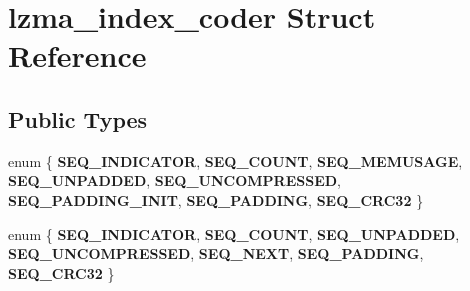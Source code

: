 \section{lzma\+\_\+index\+\_\+coder Struct Reference}
\label{structlzma__index__coder}
\subsection*{Public Types}
\begin{DoxyCompactItemize}
\item 
\mbox{\label{structlzma__index__coder_a0abb38e624bd25f4d8f9a8c272f33d70}} 
enum \{ \newline
{\bfseries S\+E\+Q\+\_\+\+I\+N\+D\+I\+C\+A\+T\+OR}, 
{\bfseries S\+E\+Q\+\_\+\+C\+O\+U\+NT}, 
{\bfseries S\+E\+Q\+\_\+\+M\+E\+M\+U\+S\+A\+GE}, 
{\bfseries S\+E\+Q\+\_\+\+U\+N\+P\+A\+D\+D\+ED}, 
\newline
{\bfseries S\+E\+Q\+\_\+\+U\+N\+C\+O\+M\+P\+R\+E\+S\+S\+ED}, 
{\bfseries S\+E\+Q\+\_\+\+P\+A\+D\+D\+I\+N\+G\+\_\+\+I\+N\+IT}, 
{\bfseries S\+E\+Q\+\_\+\+P\+A\+D\+D\+I\+NG}, 
{\bfseries S\+E\+Q\+\_\+\+C\+R\+C32}
 \}
\item 
\mbox{\label{structlzma__index__coder_a86725ed3a3240be4643ebb20cece6c31}} 
enum \{ \newline
{\bfseries S\+E\+Q\+\_\+\+I\+N\+D\+I\+C\+A\+T\+OR}, 
{\bfseries S\+E\+Q\+\_\+\+C\+O\+U\+NT}, 
{\bfseries S\+E\+Q\+\_\+\+U\+N\+P\+A\+D\+D\+ED}, 
{\bfseries S\+E\+Q\+\_\+\+U\+N\+C\+O\+M\+P\+R\+E\+S\+S\+ED}, 
\newline
{\bfseries S\+E\+Q\+\_\+\+N\+E\+XT}, 
{\bfseries S\+E\+Q\+\_\+\+P\+A\+D\+D\+I\+NG}, 
{\bfseries S\+E\+Q\+\_\+\+C\+R\+C32}
 \}
\end{DoxyCompactItemize}
